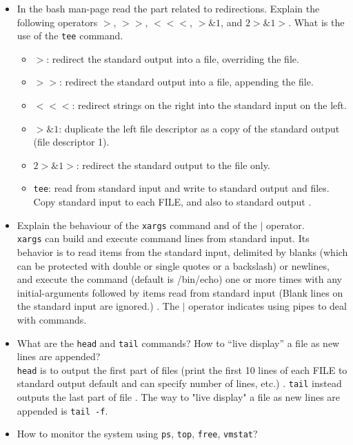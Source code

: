 \documentclass[a4paper]{article}
\begin{document}
\begin{itemize}
\begin{verbatim}
    \end{verbatim}
    \item In the bash man-page read the part related to redirections. Explain the following operators $>$, $>>$, $<<<$, $>\&1$, and $2>\&1 >$. What is the use of the \texttt{tee} command.
    \begin{itemize}
        \item $>$: redirect the standard output into a file, overriding the file.
        \item $>>$: redirect the standard output into a file, appending the file.
        \item $<<<$: redirect strings on the right into the standard input on the left.
        \item $>\&1$: duplicate the left file descriptor as a copy of the standard output (file descriptor 1).
        \item $2>\&1 >$: redirect the standard output to the file only.
        \item \texttt{tee}: read from standard input and write to standard output and files.  Copy standard input to each FILE, and also to standard output \cite{tee}.
    \end{itemize}
    \item Explain the behaviour of the \texttt{xargs} command and of the $|$ operator.\\\texttt{xargs} can build and execute command lines from standard input. Its behavior is to read items from the standard input, delimited by blanks (which can be protected with double or single quotes or a backslash) or newlines, and execute the command  (default is /bin/echo) one or more times with any initial-arguments followed by items read from standard input (Blank lines on the standard input are ignored.) \cite{xargs}. The $|$ operator indicates using pipes to deal with commands.
    \item What are the \texttt{head} and \texttt{tail} commands? How to “live display” a file as new lines are appended?\\\texttt{head} is to output the first part of files (print the first 10 lines of each FILE to standard output default and can specify number of lines, etc.) \cite{head}. \texttt{tail} instead outputs the last part of file \cite{tail}. The way to "live display" a file as new lines are appended is \texttt{tail -f}.
    \item How to monitor the system using \texttt{ps}, \texttt{top}, \texttt{free}, \texttt{vmstat}?
    \begin{itemize}

\end{itemize}
\end{itemize}
\end{document}
